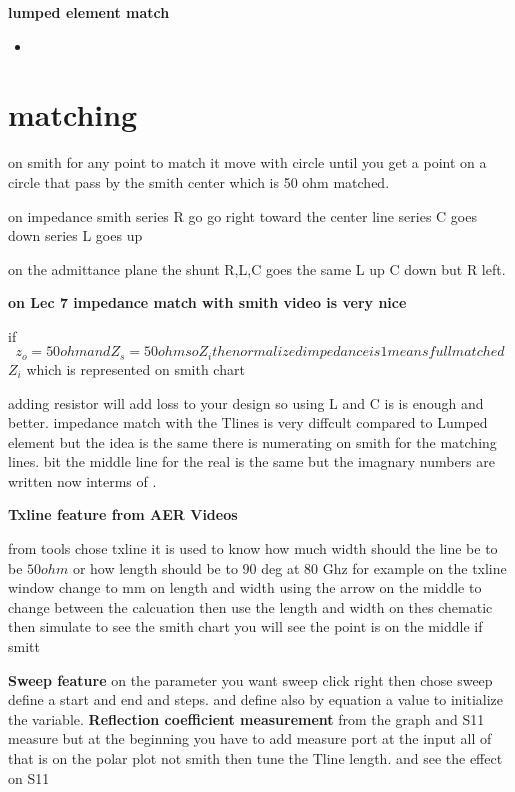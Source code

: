 \documentclass{article}
\begin{document}
\textbf{lumped element match}
\begin{itemize}
    \item 
\end{itemize}


\section{matching}

on smith for any point to match it move with circle until you get a point on a circle that pass by the smith center 
which is 50 ohm matched.

on impedance smith series R go go right toward the center line 
series C goes down
series L goes up


on the admittance plane the shunt R,L,C  goes the same L up 
C down but R left.

\textbf{on Lec 7 impedance match with smith video is very nice}

if $$z_o = 50 ohm and Z_s = 50 ohm so Z_i the normalized impedance is 1 means full matched$$
$Z_i$ which is represented on smith chart 

adding resistor will add loss to your design so using L and C is is enough and better.
impedance match with the Tlines is very diffcult compared to Lumped element but the idea is the 
same there is numerating on smith for the matching lines.
bit the middle line for the real is the same but the imagnary numbers are written now interms of \Lambda.




\textbf{Txline  feature from AER Videos}

from tools chose txline it is used to know how much width should the line be to be $50 ohm$
or how length should be to 90 deg at 80 Ghz for example
on the txline window change to mm on length and width 
using the arrow on the middle to change between the calcuation then use the length and width on thes chematic then simulate to see 
the smith chart  you will see the point is on the middle if smitt


\textbf{Sweep feature}
on the parameter you want sweep click right then chose sweep  define a start and end and steps.
 and define also by equation a value to initialize the variable.
\textbf{Reflection coefficient measurement}
from the graph and S11 measure but at the beginning you have to add measure port at the input 
all of that is on the polar plot not smith
then tune the Tline length.
and see the effect on S11 
\end{document}
